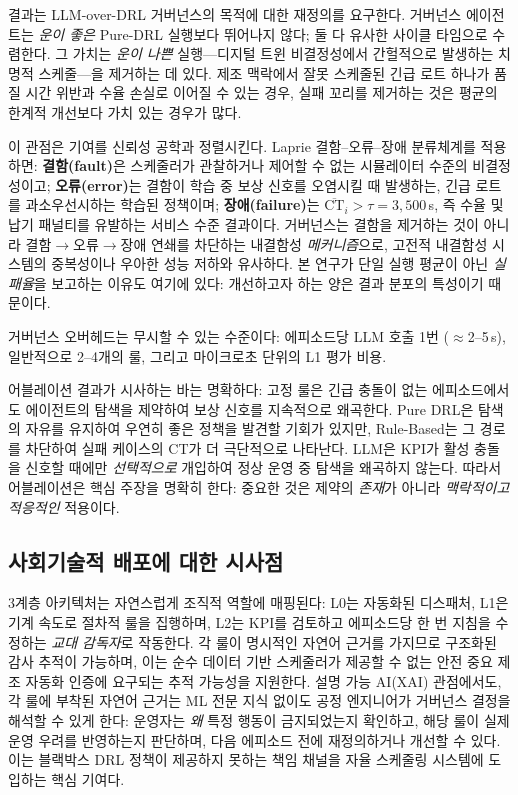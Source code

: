 \documentclass[10pt]{article}
\begin{document}
결과는 LLM-over-DRL 거버넌스의 목적에 대한 재정의를 요구한다. 거버넌스 에이전트는
\emph{운이 좋은} Pure-DRL 실행보다 뛰어나지 않다; 둘 다 유사한 사이클 타임으로
수렴한다. 그 가치는 \emph{운이 나쁜} 실행---디지털 트윈 비결정성에서 간헐적으로
발생하는 치명적 스케줄---을 제거하는 데 있다. 제조 맥락에서 잘못 스케줄된 긴급
로트 하나가 품질 시간 위반과 수율 손실로 이어질 수 있는 경우, 실패 꼬리를
제거하는 것은 평균의 한계적 개선보다 가치 있는 경우가 많다.

이 관점은 기여를 신뢰성 공학\cite{avizienis2004}과 정렬시킨다.
Laprie 결함--오류--장애 분류체계를 적용하면: \textbf{결함(fault)}은 스케줄러가
관찰하거나 제어할 수 없는 시뮬레이터 수준의 비결정성이고;
\textbf{오류(error)}는 결함이 학습 중 보상 신호를 오염시킬 때 발생하는,
긴급 로트를 과소우선시하는 학습된 정책이며;
\textbf{장애(failure)}는 $\overline{\mathrm{CT}}_i > \tau = 3{,}500$\,s,
즉 수율 및 납기 패널티를 유발하는 서비스 수준 결과이다.
거버넌스는 결함을 제거하는 것이 아니라 결함$\to$오류$\to$장애 연쇄를 차단하는
내결함성 \emph{메커니즘}으로, 고전적 내결함성 시스템의 중복성이나 우아한 성능
저하와 유사하다. 본 연구가 단일 실행 평균이 아닌 \emph{실패율}을 보고하는 이유도
여기에 있다: 개선하고자 하는 양은 결과 분포의 특성이기 때문이다.

거버넌스 오버헤드는 무시할 수 있는 수준이다: 에피소드당 LLM 호출 1번
($\approx$2--5\,s), 일반적으로 2--4개의 룰, 그리고 마이크로초 단위의 L1 평가
비용.

어블레이션 결과가 시사하는 바는 명확하다: 고정 룰은 긴급 충돌이 없는
에피소드에서도 에이전트의 탐색을 제약하여 보상 신호를 지속적으로 왜곡한다.
Pure DRL은 탐색의 자유를 유지하여 우연히 좋은 정책을 발견할 기회가 있지만,
Rule-Based는 그 경로를 차단하여 실패 케이스의 CT가 더 극단적으로 나타난다.
LLM은 KPI가 활성 충돌을 신호할 때에만 \emph{선택적으로} 개입하여 정상 운영 중
탐색을 왜곡하지 않는다. 따라서 어블레이션은 핵심 주장을 명확히 한다: 중요한 것은
제약의 \emph{존재}가 아니라 \emph{맥락적이고 적응적인} 적용이다.

\subsection{사회기술적 배포에 대한 시사점}
3계층 아키텍처는 자연스럽게 조직적 역할에 매핑된다: L0는 자동화된 디스패처,
L1은 기계 속도로 절차적 룰을 집행하며, L2는 KPI를 검토하고 에피소드당 한 번
지침을 수정하는 \emph{교대 감독자}로 작동한다. 각 룰이 명시적인 자연어 근거를 가지므로 구조화된 감사 추적이 가능하며,
이는 순수 데이터 기반 스케줄러가 제공할 수 없는 안전 중요
제조 자동화 인증에 요구되는 추적 가능성을 지원한다. 설명 가능 AI(XAI) 관점에서도,
각 룰에 부착된 자연어 근거는 ML 전문 지식 없이도 공정 엔지니어가 거버넌스 결정을
해석할 수 있게 한다: 운영자는 \emph{왜} 특정 행동이 금지되었는지 확인하고,
해당 룰이 실제 운영 우려를 반영하는지 판단하며, 다음 에피소드 전에 재정의하거나
개선할 수 있다. 이는 블랙박스 DRL 정책이 제공하지 못하는 책임 채널을 자율
스케줄링 시스템에 도입하는 핵심 기여다.
\end{document}
